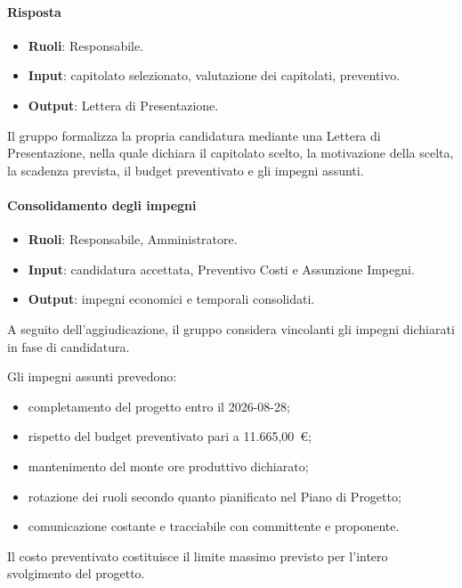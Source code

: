 \paragraph{Risposta}

\begin{itemize}
    \item \textbf{Ruoli}: Responsabile.
    \item \textbf{Input}: capitolato selezionato, valutazione dei capitolati, preventivo.
    \item \textbf{Output}: Lettera di Presentazione.
\end{itemize}

Il gruppo formalizza la propria candidatura mediante una Lettera di Presentazione,
nella quale dichiara il capitolato scelto, la motivazione della scelta, la scadenza
prevista, il budget preventivato e gli impegni assunti.

\paragraph{Consolidamento degli impegni}

\begin{itemize}
    \item \textbf{Ruoli}: Responsabile, Amministratore.
    \item \textbf{Input}: candidatura accettata, Preventivo Costi e Assunzione Impegni.
    \item \textbf{Output}: impegni economici e temporali consolidati.
\end{itemize}

A seguito dell'aggiudicazione, il gruppo considera vincolanti gli impegni dichiarati
in fase di candidatura.

Gli impegni assunti prevedono:
\begin{itemize}
    \item completamento del progetto entro il 2026-08-28;
    \item rispetto del budget preventivato pari a 11.665,00~\euro{};
    \item mantenimento del monte ore produttivo dichiarato;
    \item rotazione dei ruoli secondo quanto pianificato nel Piano di Progetto;
    \item comunicazione costante e tracciabile con committente e proponente.
\end{itemize}

Il costo preventivato costituisce il limite massimo previsto per l'intero
svolgimento del progetto.

